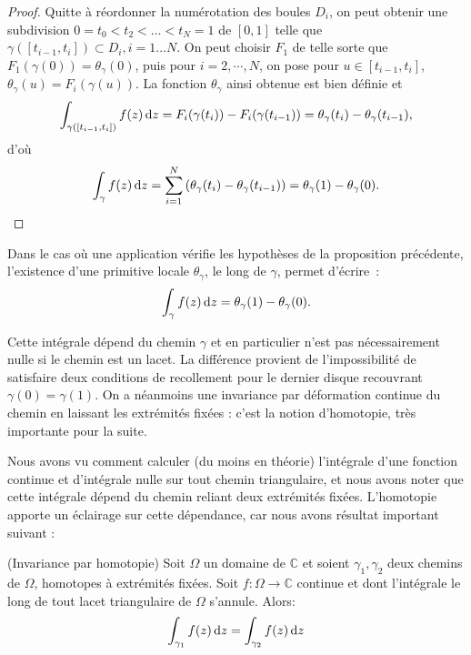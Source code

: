 \begin{proof}
Quitte à réordonner la numérotation des boules $D_i$,
on peut obtenir une subdivision $0=t_0 < t_2 < \dots < t_N = 1$ de $[0,1]$
telle que $\gamma([t_{i-1},t_i])\subset D_i, i =1\dots N$. On peut choisir $F_1$ de telle sorte que
$F_1(\gamma(0))=\theta_\gamma(0)$, puis pour $i=2, \cdots, N$, on pose pour $u \in [t_{i-1},t_i]$,
$\theta_\gamma(u)=F_i(\gamma(u))$. La fonction $\theta_\gamma$ ainsi obtenue est bien définie et 
\[\int_{\gamma([t_{i-1}, t_i])} f(z) \mathop{}\mathopen{}\mathrm{d} z = F_i(\gamma(t_i)) - F_i(\gamma(t_{i-1})) = \theta_\gamma(t_i) - \theta_\gamma(t_{i-1}),\]
d'où
\[\int_\gamma f(z) \mathop{}\mathopen{}\mathrm{d} z = \sum_{i=1}^N \left(\theta_\gamma(t_i) - \theta_\gamma(t_{i-1})\right)=\theta_\gamma(1) - \theta_\gamma(0).\]
\end{proof}

Dans le cas où une application vérifie les hypothèses de la proposition
précédente, l'existence d'une primitive locale $\theta_\gamma$, le long de $\gamma$, permet d'écrire~:
\[
\int_{\gamma} f(z) \mathop{}\mathopen{}\mathrm{d} z = \theta_\gamma(1)-\theta_\gamma(0).
\] 

Cette intégrale dépend du chemin $\gamma$ et en particulier n'est pas nécessairement nulle si le chemin est un lacet. La différence provient de l'impossibilité de satisfaire deux conditions de recollement pour le dernier disque recouvrant $\gamma(0)=\gamma(1)$. On a néanmoins une
invariance par déformation continue du chemin en laissant les extrémités fixées : c'est la notion d'homotopie, très importante pour la suite.


Nous avons vu comment calculer (du moins en théorie) l'intégrale d'une fonction continue et d'intégrale nulle sur tout chemin triangulaire, et nous avons noter que cette intégrale dépend du chemin reliant deux extrémités fixées. L'homotopie apporte un éclairage sur cette dépendance, car nous avons résultat important suivant :

\begin{fthm}(Invariance par homotopie)\label{the:invar}
Soit $\Omega$ un domaine de $\mathbb{C}$ et soient $\gamma_1, \gamma_2$ deux
chemins de $\Omega$, homotopes à extrémités fixées. Soit $f \colon
\Omega \to \mathbb{C}$ continue et dont l'intégrale le long de tout lacet
triangulaire de $\Omega$ s'annule. Alors:
\[
\int_{\gamma_1} f(z) \mathop{}\mathopen{}\mathrm{d} z = \int_{\gamma_2} f(z) \mathop{}\mathopen{}\mathrm{d} z
 \]
\end{fthm}

